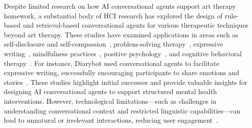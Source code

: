 Despite limited research on how AI conversational agents support art therapy homework, a substantial body of HCI research has explored the design of rule-based and retrieval-based conversational agents for various therapeutic techniques beyond art therapy. These studies have examined applications in areas such as self-disclosure and self-compassion~\cite{lee2020designing, park2021designing, lee2019caring}, problem-solving therapy~\cite{o2018suddenly, kannampallil2023effects}, expressive writing~\cite{park2021wrote}, mindfulness practices~\cite{seah2022designing, inkster2018empathy}, positive psychology~\cite{kannampallil2023effects, jeong2023deploying}, and cognitive behavioral therapy~\cite{fulmer2018using, fitzpatrick2017delivering, su2020analyzing}. For instance, Diarybot used conversational agents to facilitate expressive writing, successfully encouraging participants to share emotions and stories~\cite{park2021wrote}. These studies highlight initial successes and provide valuable insights for designing AI conversational agents to support structured mental health interventions. However, technological limitations---such as challenges in understanding conversational context and restricted linguistic capabilities---can lead to unnatural or irrelevant interactions, reducing user engagement~\cite{ma2024evaluating,kim2024mindfuldiary}.

